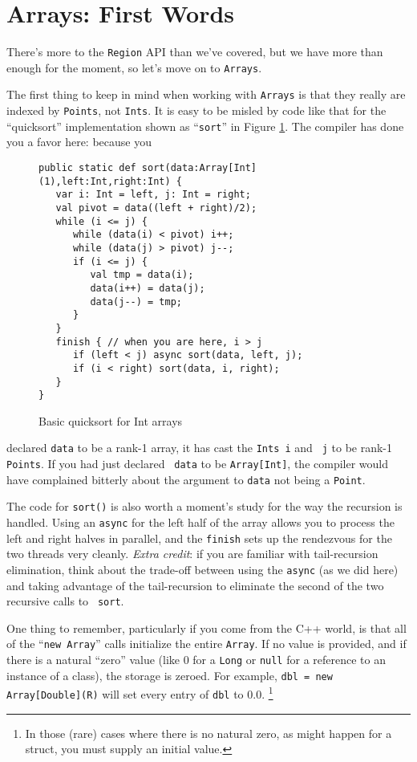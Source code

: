 \section{Arrays: First Words}

There's more to the {\tt Region} API than we've covered, but we have more than
enough for the moment, so let's move on to {\tt Arrays}.

The first thing to keep in mind when working with {\tt Arrays} is that they
really are indexed by {\tt Points}, not {\tt Ints}.  It is easy to be misled by
code like that for the ``quicksort'' implementation shown as  ``{\tt sort}'' in
Figure \ref{fig:qs}. The compiler has done you a favor here: because you 
\begin{figure}[htpb!]
\hrulefill
\begin{verbatim}
public static def sort(data:Array[Int](1),left:Int,right:Int) {
   var i: Int = left, j: Int = right;
   val pivot = data((left + right)/2);
   while (i <= j) {
      while (data(i) < pivot) i++;
      while (data(j) > pivot) j--;
      if (i <= j) {
         val tmp = data(i);
         data(i++) = data(j);
         data(j--) = tmp;
      }
   }
   finish { // when you are here, i > j
      if (left < j) async sort(data, left, j);
      if (i < right) sort(data, i, right);
   }
}
\end{verbatim}
\hrulefill
\caption{Basic quicksort for Int arrays}\label{fig:qs}
\end{figure}
declared {\tt data} to be a rank-1 array, it has cast the {\tt Ints i} and {\tt
j} to be rank-1 {\tt Points}.  If you had just declared {\tt
data} to be {\tt Array[Int]}, the compiler would have complained bitterly about
the argument to {\tt data} not being a {\tt Point}.

The code for {\tt sort()} is also worth a moment's study for the way the
recursion is handled. Using an {\tt async} for the left half of the array allows you to
process the left and right halves in parallel, and the {\tt finish} sets up the
rendezvous for the two threads very cleanly. {\em Extra credit}: if you are
familiar with tail-recursion elimination, think about the trade-off between
using the {\tt async} (as we did here) and taking advantage of the
tail-recursion to eliminate the second of the two recursive calls to {\tt
sort}.

One thing to remember, particularly if you come from the C++ world, is that 
all of the ``{\tt new Array}'' calls initialize the entire {\tt Array}.  If no
value is provided, and if there is a natural ``zero'' value (like 0 for a
{\tt Long} or {\tt null} for a reference to an instance of a class),
the storage is zeroed.  For example, {\tt dbl = new
Array[Double](R)} will set every entry of {\tt dbl} to 0.0.
\footnote{
In those (rare) cases where there is no natural zero, as might happen
for a struct, you must supply an initial value.  
}


